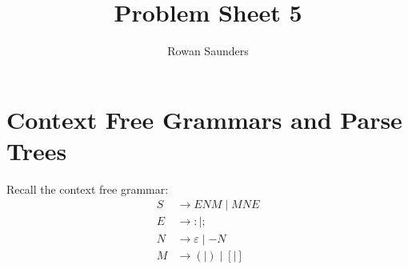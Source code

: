 \documentclass[11pt]{article}
\title{Problem Sheet 5}
\author{Rowan Saunders}
\begin{document}
\begin{titlepage}
	\maketitle
\end{titlepage}

\section{Context Free Grammars and Parse Trees}
Recall the context free grammar:
\begin{align*}
	S &\to ENM \mid MNE\\
	E &\to : \mid ;\\
	N &\to \varepsilon \mid -N\\
	M &\to ( \mid ) \mid [ \mid ]
\end{align*}
\end{document}
